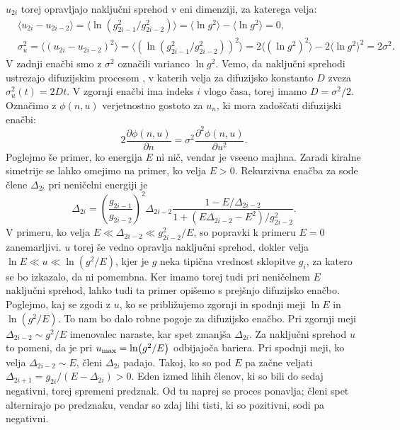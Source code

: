 \begin{appendices}
$u_{2i}$ torej opravljajo naključni sprehod v eni dimenziji, za katerega velja:
\begin{align}
&\langle u_{2i} - u_{2i-2} \rangle = \langle \ln (g^2_{2i-1}/g^2_{2i-2}) \rangle =  \langle \ln g^2 \rangle -  \langle \ln g^2 \rangle = 0, \\
&\sigma_u^2 = \langle (u_{2i} - u_{2i-2})^2 \rangle = \langle (\ln (g^2_{2i-1}/g^2_{2i-2}))^2 \rangle = 2 \langle (\ln g^2)^2 \rangle - 2 \langle \ln g^2 \rangle^2 = 2 \sigma^2. 
\end{align}
V zadnji enačbi smo z $\sigma^2$ označili varianco $\ln g^2$.
Vemo, da naključni sprehodi ustrezajo difuzijskim procesom \cite{diffusion}, v katerih velja za difuzijsko konstanto $D$ zveza $\sigma_u^2(t) = 2Dt$. V zgornji enačbi ima indeks $i$ vlogo časa, torej imamo $D=\sigma^2 / 2$. Označimo z $\phi (n, u)$ verjetnostno gostoto za $u_n$, ki mora zadoščati difuzijski enačbi:
\begin{equation}
2 \frac{\partial \phi (n,u)}{\partial n} = \sigma^2 \frac{\partial^2 \phi (n,u)}{\partial u^2}.
\end{equation}
Poglejmo še primer, ko energija $E$ ni nič, vendar je vseeno majhna.
Zaradi kiralne simetrije se lahko omejimo na primer, ko velja $E > 0$.
Rekurzivna enačba za sode člene $\Delta_{2i}$ pri neničelni energiji je
\begin{equation}
\Delta_{2i} = \left(\frac{g_{2i -1}}{g_{2i-2}} \right)^2 \Delta_{2i-2} \frac{1 - E/\Delta_{2i-2}}{1+ (E \Delta_{2i-2} - E^2)/g_{2i-2}^2}.
\end{equation}
V primeru, ko velja $E \ll \Delta_{2i-2} \ll g_{2i-2}^2/E$, so popravki k primeru $E=0$ zanemarljivi. $u$ torej še vedno opravlja naključni sprehod, dokler velja
$\ln E \ll u \ll \ln (g^2 / E)$, kjer je $g$ neka tipična vrednost sklopitve $g_i$, za katero se bo izkazalo, da ni pomembna. 
Ker imamo torej tudi pri neničelnem $E$ naključni sprehod, lahko tudi ta primer opišemo s prejšnjo difuzijsko enačbo. Poglejmo, kaj se zgodi z $u$, ko se približujemo zgornji in spodnji meji $\ln E$ in $\ln (g^2 / E)$. To nam bo dalo robne pogoje za difuzijsko enačbo.
Pri zgornji meji $\Delta_{2i-2} \sim g^2/E$ imenovalec naraste, kar spet zmanjša $\Delta_{2i}$. Za naključni sprehod $u$ to pomeni, da je
pri $u_{\textup{max}} = \ln (g^2 / E)$ odbijajoča bariera.
Pri spodnji meji, ko velja $\Delta_{2i-2} \sim E$, členi $\Delta_{2i}$ padajo. Takoj, ko so pod $E$ pa začne veljati 
$\Delta_{2i+1} = g_{2i} / (E - \Delta_{2i}) > 0$. Eden izmed lihih členov, ki so bili do sedaj negativni, torej spremeni predznak. Od tu naprej se proces ponavlja; členi spet alternirajo po predznaku, vendar so zdaj lihi tisti, ki so pozitivni, sodi pa negativni.

\end{appendices}
